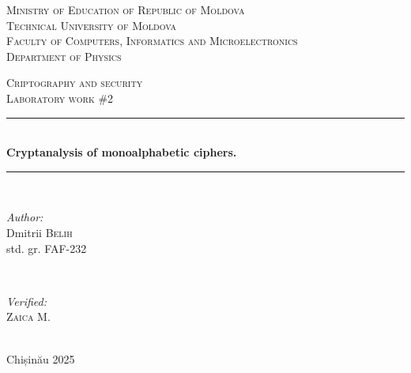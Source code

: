 \documentclass[12pt]{article}
\begin{document}
\begin{titlepage}
   \begin{center}
    \textsc{\large Ministry of Education of Republic of Moldova}\\[0.5cm]
    \textsc{\large Technical University of Moldova}\\[0.5cm]
    \textsc{\large Faculty of Computers, Informatics and Microelectronics}\\[0.5cm]
    \textsc{\large Department of Physics}\\[1.2cm]
    
    \vspace{25 mm}
    
    \textsc{\Large Criptography and security}\\[0.5cm]
    \textsc{\large Laboratory work \#2}\\[0.5cm]    %
    
    \newcommand{\HRule}{\rule{\linewidth}{0.5mm}}
    \vspace{10 mm}
    \HRule \\[0.4cm]
    { \LARGE \bfseries Cryptanalysis of monoalphabetic ciphers.}\\[0.4cm] %
    \HRule \\[1.5cm]
    
    \vspace{10mm}
    
    \begin{minipage}[t]{0.4\textwidth}
    \begin{flushleft} \large
    \emph{Author:} \\
    Dmitrii \textsc{Belih}\\                         %
    std. gr. FAF-232                                %
    \end{flushleft}
    \end{minipage}
    ~
    \begin{minipage}[t]{0.4\textwidth}
    \begin{flushright} \large
    \emph{Verified:} \\
    \textsc{Zaica} M.\\
    \end{flushright}
    \end{minipage}\\[3cm]
    
    \vspace{5 mm}
    \large Chișinău 2025\\[0.5cm]
    
    \vfill
    \end{center}
\end{titlepage}
\end{document}
